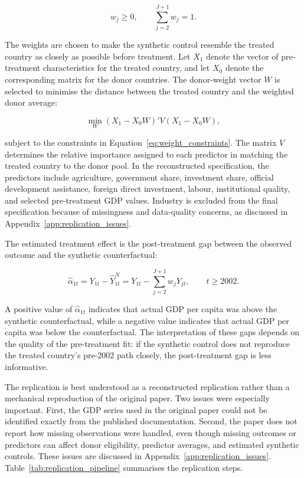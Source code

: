 \documentclass[a4paper]{article}
\begin{document}
\begin{equation}
w_j \geq 0,
\qquad
\sum_{j=2}^{J+1} w_j = 1.
\label{eq:weight_constraints}
\end{equation}

The weights are chosen to make the synthetic control resemble the treated country as closely as possible before treatment. Let \(X_1\) denote the vector of pre-treatment characteristics for the treated country, and let \(X_0\) denote the corresponding matrix for the donor countries. The donor-weight vector \(W\) is selected to minimise the distance between the treated country and the weighted donor average:

\begin{equation}
\min_W
\left(X_1 - X_0 W\right)' V \left(X_1 - X_0 W\right),
\label{eq:scm_minimization}
\end{equation}

subject to the constraints in Equation~\ref{eq:weight_constraints}. The matrix \(V\) determines the relative importance assigned to each predictor in matching the treated country to the donor pool. In the reconstructed specification, the predictors include agriculture, government share, investment share, official development assistance, foreign direct investment, labour, institutional quality, and selected pre-treatment GDP values. Industry is excluded from the final specification because of missingness and data-quality concerns, as discussed in Appendix~\ref{app:replication_issues}.

The estimated treatment effect is the post-treatment gap between the observed outcome and the synthetic counterfactual:

\begin{equation}
\widehat{\alpha}_{1t}
=
Y_{1t}
-
\widehat{Y}_{1t}^{N}
=
Y_{1t}
-
\sum_{j=2}^{J+1} w_j Y_{jt},
\qquad t \geq 2002.
\label{eq:treatment_effect}
\end{equation}

A positive value of \(\widehat{\alpha}_{1t}\) indicates that actual GDP per capita was above the synthetic counterfactual, while a negative value indicates that actual GDP per capita was below the counterfactual. The interpretation of these gaps depends on the quality of the pre-treatment fit: if the synthetic control does not reproduce the treated country's pre-2002 path closely, the post-treatment gap is less informative.

The replication is best understood as a reconstructed replication rather than a mechanical reproduction of the original paper. Two issues were especially important. First, the GDP series used in the original paper could not be identified exactly from the published documentation. Second, the paper does not report how missing observations were handled, even though missing outcomes or predictors can affect donor eligibility, predictor averages, and estimated synthetic controls. These issues are discussed in Appendix~\ref{app:replication_issues}. 
Table~\ref{tab:replication_pipeline} summarises the replication steps.
\end{document}

